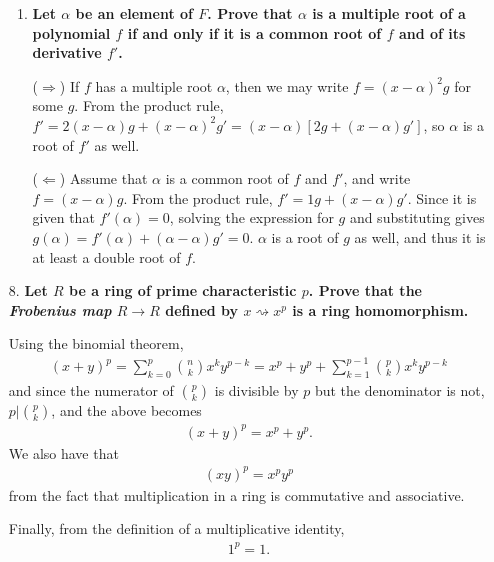 \documentclass[a4paper,12pt]{article}
\begin{document}
\begin{enumerate}
\begin{enumerate}
            \item
                \boldmath
                \textbf{Let $\alpha$ be an element of $F$. Prove that $\alpha$ is a multiple root of a polynomial $f$ if and only if it is a common root of $f$ and of its derivative $f'$.} \par
                \unboldmath
                ($\Rightarrow$) If $f$ has a multiple root $\alpha$, then we may write $f = (x - \alpha)^2 g$ for some $g$. From the product rule, $f' = 2(x - \alpha)g + (x - \alpha)^2 g' = (x - \alpha)[2g + (x - \alpha)g']$, so $\alpha$ is a root of $f'$ as well. \par
                ($\Leftarrow$) Assume that $\alpha$ is a common root of $f$ and $f'$, and write $f = (x - \alpha) g$. From the product rule, $f' = 1g + (x - \alpha)g'$. Since it is given that $f'(\alpha) = 0$, solving the expression for $g$ and substituting gives $g(\alpha) = f'(\alpha) + (\alpha - \alpha)g' = 0$. $\alpha$ is a root of $g$ as well, and thus it is at least a double root of $f$.
        \end{enumerate}

    \item[8.]
        \boldmath
        \textbf{Let $R$ be a ring of prime characteristic $p$. Prove that the \textit{Frobenius map} $R \to R$ defined by $x \rightsquigarrow x^p$ is a ring homomorphism.} \par
        \unboldmath
        Using the binomial theorem,
        \begin{align*}
            (x + y)^p = \sum_{k = 0}^p \binom{n}{k} x^k y^{p - k} = x^p + y^p + \sum_{k = 1}^{p - 1} \binom{p}{k} x^k y^{p - k}
        \end{align*}
        and since the numerator of $\binom{p}{k}$ is divisible by $p$ but the denominator is not, $p | \binom{p}{k}$, and the above becomes
        \begin{align*}
            (x + y)^p = x^p + y^p.
        \end{align*}
        We also have that
        \begin{align*}
            (xy)^p = x^p y^p
        \end{align*}
        from the fact that multiplication in a ring is commutative and associative. \par
        Finally, from the definition of a multiplicative identity,
        \begin{align*}
            1^p = 1.
        \end{align*}


\end{enumerate}
\end{document}
